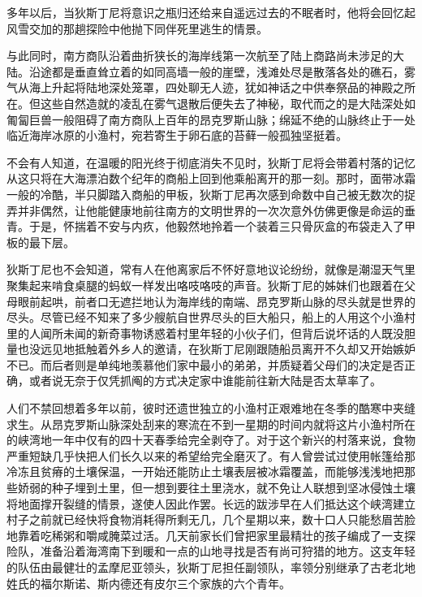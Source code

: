 

多年以后，当狄斯丁尼将意识之瓶归还给来自遥远过去的不眠者时，他将会回忆起风雪交加的那趟探险中他抛下同伴死里逃生的情景。

与此同时，南方商队沿着曲折狭长的海岸线第一次航至了陆上商路尚未涉足的大陆。沿途都是垂直耸立着的如同高墙一般的崖壁，浅滩处尽是散落各处的礁石，雾气从海上升起将陆地深处笼罩，四处聊无人迹，犹如神话之中供奉祭品的神殿之所在。但这些自然造就的凌乱在雾气退散后便失去了神秘，取代而之的是大陆深处如匍匐巨兽一般阻碍了南方商队上百年的昂克罗斯山脉；绵延不绝的山脉终止于一处临近海岸冰原的小渔村，宛若寄生于卵石底的苔藓一般孤独坚挺着。

不会有人知道，在温暖的阳光终于彻底消失不见时，狄斯丁尼将会带着村落的记忆从这只将在大海漂泊数个纪年的商船上回到他乘船离开的那一刻。那时，面带冰霜一般的冷酷，半只脚踏入商船的甲板，狄斯丁尼再次感到命数中自己被无数次的捉弄并非偶然，让他能健康地前往南方的文明世界的一次次意外仿佛更像是命运的垂青。于是，怀揣着不安与内疚，他毅然地拎着一个装着三只骨灰盒的布袋走入了甲板的最下层。

狄斯丁尼也不会知道，常有人在他离家后不怀好意地议论纷纷，就像是潮湿天气里聚集起来啃食桌腿的蚂蚁一样发出咯吱咯吱的声音。狄斯丁尼的姊妹们也跟着在父母眼前起哄，前者口无遮拦地认为海岸线的南端、昂克罗斯山脉的尽头就是世界的尽头。尽管已经不知来了多少艘航自世界尽头的巨大船只，船上的人用这个小渔村里的人闻所未闻的新奇事物诱惑着村里年轻的小伙子们，但背后说坏话的人既没胆量也没远见地抵触着外乡人的邀请，在狄斯丁尼刚跟随船员离开不久却又开始嫉妒不已。而后者则是单纯地羡慕他们家中最小的弟弟，并质疑着父母们的决定是否正确，或者说无奈于仅凭抓阄的方式决定家中谁能前往新大陆是否太草率了。

人们不禁回想着多年以前，彼时还遗世独立的小渔村正艰难地在冬季的酷寒中夹缝求生。从昂克罗斯山脉深处刮来的寒流在不到一星期的时间内就将这片小渔村所在的峡湾地一年中仅有的四十天春季给完全剥夺了。对于这个新兴的村落来说，食物严重短缺几乎快把人们长久以来的希望给完全磨灭了。有人曾尝试过使用帐篷给那冷冻且贫瘠的土壤保温，一开始还能防止土壤表层被冰霜覆盖，而能够浅浅地把那些娇弱的种子埋到土里，但一想到要往土里浇水，就不免让人联想到坚冰侵蚀土壤将地面撑开裂缝的情景，遂使人因此作罢。长远的跋涉早在人们抵达这个峡湾建立村子之前就已经快将食物消耗得所剩无几，几个星期以来，数十口人只能愁眉苦脸地靠着吃稀粥和嚼咸腌菜过活。几天前家长们曾把家里最精壮的孩子编成了一支探险队，准备沿着海湾南下到暖和一点的山地寻找是否有尚可狩猎的地方。这支年轻的队伍由最健壮的孟摩尼亚领头，狄斯丁尼担任副领队，率领分别继承了古老北地姓氏的福尔斯诺、斯内德还有皮尔三个家族的六个青年。

